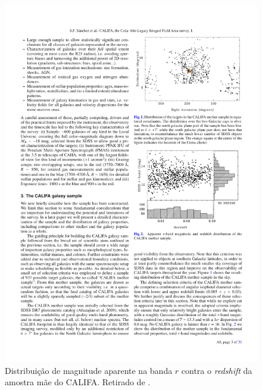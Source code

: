 \begin{figure}
	\includegraphics[width=1.0\textwidth]{figuras/CALIFASample}
	\caption[Distribuição de magnitude $r$ contra {\em redshift} da amostra mãe
	do CALIFA] {Distribuição de magnitude aparente na banda $r$ contra o {\em
	redshift} da amostra mãe do CALIFA. Retirado de \citet{Sanchez2012}.}
	\label{fig:CALIFASample}
\end{figure}

